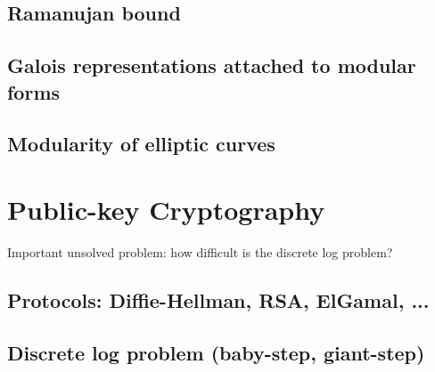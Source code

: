 \documentclass{book}
\begin{document}
\section{Ramanujan bound}
\section{Galois representations attached to modular forms}
\section{Modularity of elliptic curves}




\chapter{Public-key Cryptography}

Important unsolved problem: how difficult is the discrete log problem?

\section{Protocols: Diffie-Hellman, RSA, ElGamal, ...}
\section{Discrete log problem (baby-step, giant-step)}




\end{document}
